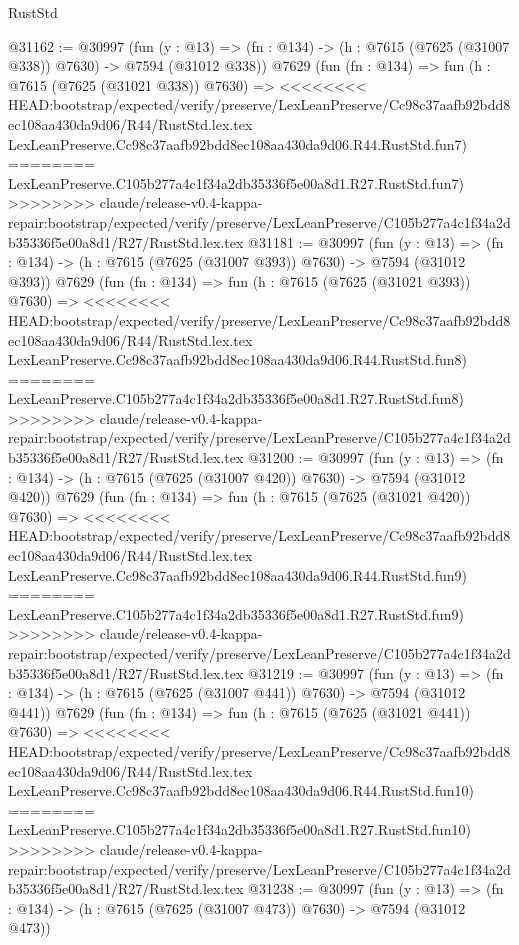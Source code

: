 \begin{lexlean}{RustStd}
\begin{coremodule}
{\begin{coremodule}
{{{{{{{{{{{{{{{{{{{{{{{{{{{{{{{{{{@31162 := @30997
    (fun (y : @13) => (fn : @134) -> (h : @7615 (@7625 (@31007 @338)) @7630) -> @7594 (@31012 @338))
    @7629
    (fun (fn : @134) =>
    fun (h : @7615 (@7625 (@31021 @338)) @7630) =>
<<<<<<<< HEAD:bootstrap/expected/verify/preserve/LexLeanPreserve/Cc98c37aafb92bdd8ec108aa430da9d06/R44/RustStd.lex.tex
    LexLeanPreserve.Cc98c37aafb92bdd8ec108aa430da9d06.R44.RustStd.fun7)
========
    LexLeanPreserve.C105b277a4c1f34a2db35336f5e00a8d1.R27.RustStd.fun7)
>>>>>>>> claude/release-v0.4-kappa-repair:bootstrap/expected/verify/preserve/LexLeanPreserve/C105b277a4c1f34a2db35336f5e00a8d1/R27/RustStd.lex.tex
@31181 := @30997
    (fun (y : @13) => (fn : @134) -> (h : @7615 (@7625 (@31007 @393)) @7630) -> @7594 (@31012 @393))
    @7629
    (fun (fn : @134) =>
    fun (h : @7615 (@7625 (@31021 @393)) @7630) =>
<<<<<<<< HEAD:bootstrap/expected/verify/preserve/LexLeanPreserve/Cc98c37aafb92bdd8ec108aa430da9d06/R44/RustStd.lex.tex
    LexLeanPreserve.Cc98c37aafb92bdd8ec108aa430da9d06.R44.RustStd.fun8)
========
    LexLeanPreserve.C105b277a4c1f34a2db35336f5e00a8d1.R27.RustStd.fun8)
>>>>>>>> claude/release-v0.4-kappa-repair:bootstrap/expected/verify/preserve/LexLeanPreserve/C105b277a4c1f34a2db35336f5e00a8d1/R27/RustStd.lex.tex
@31200 := @30997
    (fun (y : @13) => (fn : @134) -> (h : @7615 (@7625 (@31007 @420)) @7630) -> @7594 (@31012 @420))
    @7629
    (fun (fn : @134) =>
    fun (h : @7615 (@7625 (@31021 @420)) @7630) =>
<<<<<<<< HEAD:bootstrap/expected/verify/preserve/LexLeanPreserve/Cc98c37aafb92bdd8ec108aa430da9d06/R44/RustStd.lex.tex
    LexLeanPreserve.Cc98c37aafb92bdd8ec108aa430da9d06.R44.RustStd.fun9)
========
    LexLeanPreserve.C105b277a4c1f34a2db35336f5e00a8d1.R27.RustStd.fun9)
>>>>>>>> claude/release-v0.4-kappa-repair:bootstrap/expected/verify/preserve/LexLeanPreserve/C105b277a4c1f34a2db35336f5e00a8d1/R27/RustStd.lex.tex
@31219 := @30997
    (fun (y : @13) => (fn : @134) -> (h : @7615 (@7625 (@31007 @441)) @7630) -> @7594 (@31012 @441))
    @7629
    (fun (fn : @134) =>
    fun (h : @7615 (@7625 (@31021 @441)) @7630) =>
<<<<<<<< HEAD:bootstrap/expected/verify/preserve/LexLeanPreserve/Cc98c37aafb92bdd8ec108aa430da9d06/R44/RustStd.lex.tex
    LexLeanPreserve.Cc98c37aafb92bdd8ec108aa430da9d06.R44.RustStd.fun10)
========
    LexLeanPreserve.C105b277a4c1f34a2db35336f5e00a8d1.R27.RustStd.fun10)
>>>>>>>> claude/release-v0.4-kappa-repair:bootstrap/expected/verify/preserve/LexLeanPreserve/C105b277a4c1f34a2db35336f5e00a8d1/R27/RustStd.lex.tex
@31238 := @30997
    (fun (y : @13) => (fn : @134) -> (h : @7615 (@7625 (@31007 @473)) @7630) -> @7594 (@31012 @473))
}}}}}}}}}}}}}}}}}}}}}}}}}}}}}}}}}}
\end{coremodule}}
\end{coremodule}
\end{lexlean}
